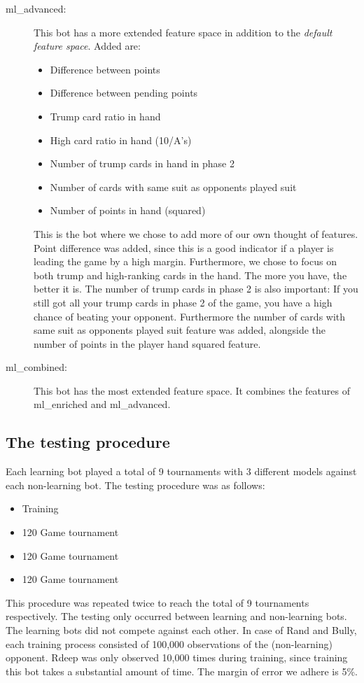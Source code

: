 \documentclass[a4paper,11pt]{article}
\begin{document}
\begin{description}
\clearpage
\item [ml\_advanced:] 
This bot has a more extended feature space in addition to the \textit{default feature space}. Added are: 
\begin{itemize}
\item Difference between points
\item Difference between pending points
\item Trump card ratio in hand
\item High card ratio in hand (10/A's)
\item Number of trump cards in hand in phase 2
\item Number of cards with same suit as opponents played suit
\item Number of points in hand (squared)
\end{itemize}
This is the bot where we chose to add more of our own thought of features. Point difference was added, since this is a good indicator if a player is leading the game by a high margin. Furthermore, we chose to focus on both trump and high-ranking cards in the hand. The more you have, the better it is. The number of trump cards in phase 2 is also important: If you still got all your trump cards in phase 2 of the game, you have a high chance of beating your opponent. Furthermore the number of cards with same suit as opponents played suit feature was added, alongside the number of points in the player hand squared feature.

\item[ml\_combined:] This bot has the most extended feature space. It combines the features of ml\_enriched and ml\_advanced.
\end{description}
\subsection{The testing procedure}

Each learning bot played a total of 9 tournaments with 3 different models against each non-learning bot.
The testing procedure was as follows:
\begin{itemize}
\item Training
\item 120 Game tournament
\item 120 Game tournament
\item 120 Game tournament
\end{itemize}

This procedure was repeated twice to reach the total of 9 tournaments respectively. The testing only occurred between learning and non-learning bots.  The learning bots did not compete against each other.  In case of Rand and Bully, each training process consisted of 100,000 observations of the (non-learning) opponent. Rdeep was only observed 10,000 times during training, since training this bot takes a substantial amount of time. The margin of error we adhere is 5\%.
\clearpage
\end{document}
